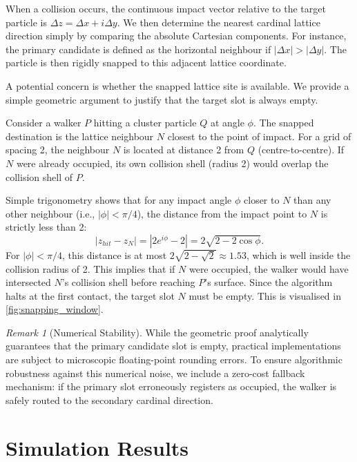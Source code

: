 \documentclass[12pt, a4paper, oneside]{report}
\theoremstyle{remark}
\newtheorem{remark}[theorem]{Remark}
\begin{document}
When a collision occurs, the continuous impact vector relative to the target particle is $\Delta z = \Delta x + i\Delta y$. We then determine the nearest cardinal lattice direction simply by comparing the absolute Cartesian components. For instance, the primary candidate is defined as the horizontal neighbour if $|\Delta x| > |\Delta y|$. The particle is then rigidly snapped to this adjacent lattice coordinate.

A potential concern is whether the snapped lattice site is available. We provide a simple geometric argument to justify that the target slot is always empty.

Consider a walker $P$ hitting a cluster particle $Q$ at angle $\phi$. The snapped destination is the lattice neighbour $N$ closest to the point of impact. For a grid of spacing 2, the neighbour $N$ is located at distance 2 from $Q$ (centre-to-centre).
If $N$ were already occupied, its own collision shell (radius 2) would overlap the collision shell of $P$.

Simple trigonometry shows that for any impact angle $\phi$ closer to $N$ than any other neighbour (i.e., $|\phi| < \pi/4$), the distance from the impact point to $N$ is strictly less than 2:
\begin{equation*}
    |z_{hit} - z_{N}| = |2e^{i\phi} - 2| = 2\sqrt{2 - 2\cos\phi}.
\end{equation*}
For $|\phi| < \pi/4$, this distance is at most $2\sqrt{2 - \sqrt{2}} \approx 1.53$, which is well inside the collision radius of 2.
This implies that if $N$ were occupied, the walker would have intersected $N$'s collision shell before reaching $P$'s surface. Since the algorithm halts at the first contact, the target slot $N$ must be empty. This is visualised in \cref{fig:snapping_window}.

\begin{remark}[Numerical Stability]
    While the geometric proof analytically guarantees that the primary candidate slot is empty, practical implementations are subject to microscopic floating-point rounding errors. To ensure algorithmic robustness against this numerical noise, we include a zero-cost fallback mechanism: if the primary slot erroneously registers as occupied, the walker is safely routed to the secondary cardinal direction.
\end{remark}

\chapter{Simulation Results}
\label{ch:results}
\end{document}
